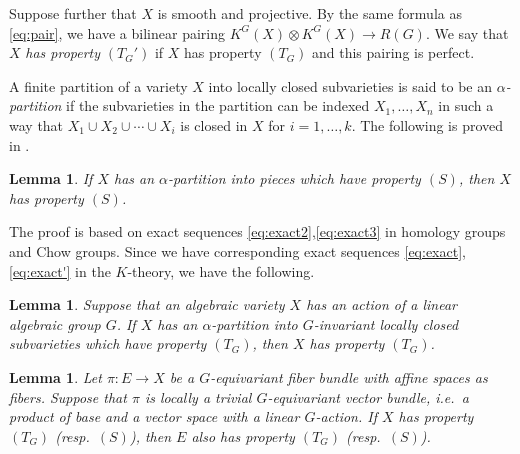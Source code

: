 \documentclass[12pt]{amsart}
\newcommand{\rom}{\textup}
\newtheorem{Lemma}[equation]{Lemma}
\theoremstyle{definition}
\theoremstyle{remark}
\numberwithin{equation}{subsection}
\begin{document}
Suppose further that $X$ is smooth and projective. By the same formula 
as \eqref{eq:pair}, we have a bilinear pairing
$K^G(X)\otimes K^G(X)\to R(G)$. We say that $X$ {\it has property\/}
$(T_G')$ if $X$ has property $(T_G)$ and this pairing is perfect.

A finite partition of a variety $X$ into locally closed subvarieties
is said to be an {\it $\alpha$-partition\/} if the subvarieties in the
partition can be indexed $X_1, \dots, X_n$ in such a way that $X_1\cup
X_2\cup \cdots \cup X_i$ is closed in $X$ for $i=1,\dots,k$. The
following is proved in \cite[Lemma~1.8]{DLP}.

\begin{Lemma}\label{lem:alpha}
If $X$ has an $\alpha$-partition into pieces which have property
$(S)$, then $X$ has property $(S)$.
\end{Lemma}

The proof is based on exact sequences
\eqref{eq:exact2},\eqref{eq:exact3} in homology groups and Chow
groups. Since we have corresponding exact sequences
\eqref{eq:exact},\eqref{eq:exact'} in the $K$-theory, we have the
following.
\begin{Lemma}\label{lem:alpha'}
Suppose that an algebraic variety $X$ has an action of a linear
algebraic group $G$. If $X$ has an $\alpha$-partition into
$G$-invariant locally closed subvarieties which have property
$(T_G)$, then $X$ has property $(T_G)$.
\end{Lemma}

\begin{Lemma}\label{lem:vector_bundle}
Let $\pi\colon E\to X$ be a $G$-equivariant fiber bundle with affine
spaces as fibers. Suppose that $\pi$ is locally a trivial
$G$-equivariant vector bundle, i.e.\ a product of base and a vector
space with a linear $G$-action. If $X$ has property $(T_G)$
\rom(resp.\ $(S)$\rom),
%
then $E$ also has property $(T_G)$ \rom(resp.\ $(S)$\rom).
\end{Lemma}
\end{document}
